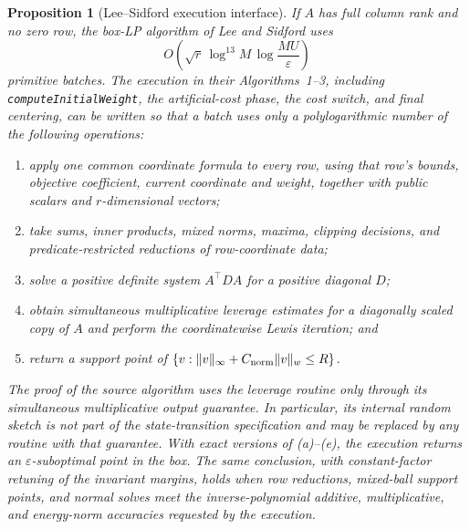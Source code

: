 \documentclass[11pt]{article}
\newtheorem{proposition}[theorem]{Proposition}
\theoremstyle{definition}
\newcommand{\eps}{\varepsilon}
\begin{document}
\begin{proposition}[Lee--Sidford execution interface]
\label{prop:ls-batches}
If $A$ has full column rank and no zero row, the box-LP algorithm of Lee and
Sidford uses
\[
 O\!\left(\sqrt r\,\log^{13}M\,
          \log\frac{MU}{\eps}\right)
\]
primitive batches.  The execution in their Algorithms~1--3, including
\texttt{computeInitialWeight}, the artificial-cost phase, the cost switch,
and final centering, can be written so that a batch uses only a
polylogarithmic number of the following operations:
\begin{enumerate}[label=(\alph*)]
\item apply one common coordinate formula to every row, using that row's
      bounds, objective coefficient, current coordinate and weight, together
      with public scalars and $r$-dimensional vectors;
\item take sums, inner products, mixed norms, maxima, clipping decisions, and
      predicate-restricted reductions of row-coordinate data;
\item solve a positive definite system $A^\top DA$ for a positive diagonal
      $D$;
\item obtain simultaneous multiplicative leverage estimates for a diagonally
      scaled copy of $A$ and perform the coordinatewise Lewis iteration; and
\item return a support point of
      $\{v:\|v\|_\infty+C_{\rm norm}\|v\|_w\le R\}$.
\end{enumerate}
The proof of the source algorithm uses the leverage routine only through its
simultaneous multiplicative output guarantee.  In particular, its internal
random sketch is not part of the state-transition specification and may be
replaced by any routine with that guarantee.  With exact versions of
(a)--(e), the execution returns an $\eps$-suboptimal point in the box.
The same conclusion, with constant-factor retuning of the invariant margins,
holds when row reductions, mixed-ball support points, and normal solves meet
the inverse-polynomial additive, multiplicative, and energy-norm accuracies
requested by the execution.
\end{proposition}
\end{document}
